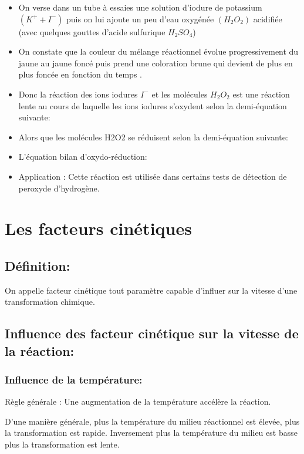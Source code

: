 \documentclass[12pt]{article}
\begin{document}
\begin{itemize}
  \item On verse dans un tube à essaies une solution d'iodure de potassium $(K^+ + I^-)$ puis on lui ajoute un peu d'eau oxygénée $(H_2O_2)$ acidifiée (avec quelques gouttes d'acide sulfurique $H_2SO_4$)
  \item On constate que la couleur du mélange réactionnel
évolue progressivement du jaune au jaune foncé puis prend une coloration brune qui devient de plus en plus foncée en fonction du
temps .
\item Donc la réaction des ions iodures $I^-$ et les molécules $H_2O_2$ est une réaction lente au cours de laquelle les
	ions iodures s'oxydent selon la demi-équation suivante: 

\item Alors que les molécules H2O2 se réduisent selon la demi-équation suivante: 


\item L'équation bilan d'oxydo-réduction: 

\item Application : Cette réaction est utilisée dans certains tests de détection de peroxyde d'hydrogène.
\end{itemize}
\section{Les facteurs cinétiques }
\subsection{Définition: }
On appelle facteur cinétique tout paramètre capable d'influer sur la vitesse d'une transformation chimique.

\subsection{Influence des facteur cinétique sur la vitesse de la réaction:}
\subsubsection{Influence de la température: }

Règle générale : Une augmentation de la température accélère la réaction.

D'une manière générale, plus la température du milieu réactionnel est élevée, plus la transformation est rapide. Inversement plus la température du milieu est basse plus la transformation est lente.
\end{document}
